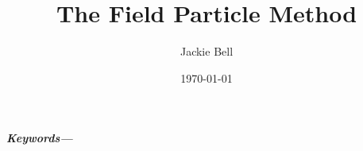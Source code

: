 \documentclass[11pt]{article}
\title{The Field Particle Method}
\author{Jackie Bell}
\date{\today}
\providecommand{\keywords}[1]
{
  \small	
  \textbf{\textit{Keywords---}} #1
}
\begin{document}
\maketitle
\begin{abstract}
\end{abstract}

\keywords{
}










\end{document}
